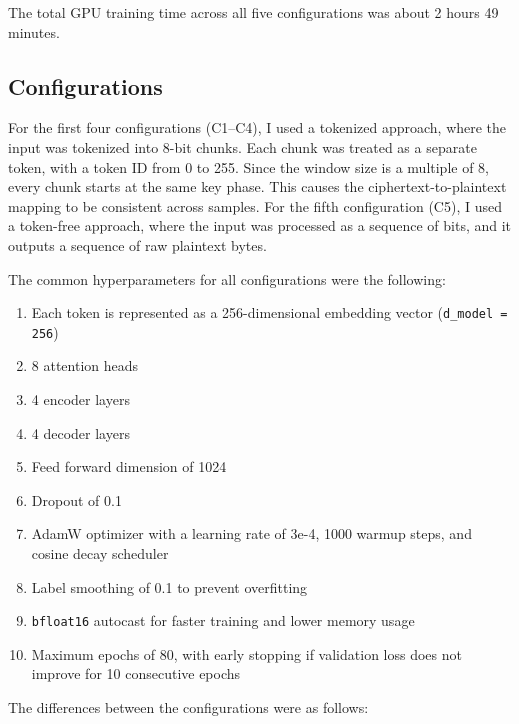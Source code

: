 \documentclass[12pt]{article}
\begin{document}
The total GPU training time across all five configurations was about 2 hours 49
minutes.

\subsection{Configurations}

For the first four configurations (C1--C4), I used a tokenized approach, where
the input was tokenized into 8-bit chunks. Each chunk was treated as a separate
token, with a token ID from 0 to 255. Since the window size is a multiple of 8,
every chunk starts at the same key phase. This causes the ciphertext-to-plaintext
mapping to be consistent across samples. For the fifth configuration (C5), I
used a token-free approach, where the input was processed as a sequence of bits,
and it outputs a sequence of raw plaintext bytes.

The common hyperparameters for all configurations were the following:

\begin{enumerate}\itemsep0pt
  \item Each token is represented as a 256-dimensional embedding vector
        (\texttt{d\_model = 256})
  \item 8 attention heads
  \item 4 encoder layers
  \item 4 decoder layers
  \item Feed forward dimension of 1024
  \item Dropout of 0.1
  \item AdamW optimizer with a learning rate of 3e-4, 1000 warmup steps, and
        cosine decay scheduler
  \item Label smoothing of 0.1 to prevent overfitting
  \item \texttt{bfloat16} autocast for faster training and lower memory usage
  \item Maximum epochs of 80, with early stopping if validation loss does not
        improve for 10 consecutive epochs
\end{enumerate}

The differences between the configurations were as follows:
\end{document}
